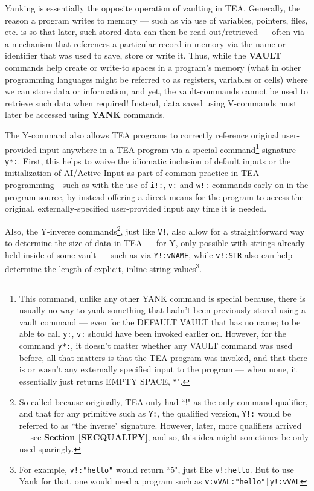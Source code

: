 \documentclass[a4paper, 18pt]{book} %
\begin{document}
{{{Yanking is essentially the opposite operation of vaulting in TEA. Generally, the reason a program writes to memory --- such as via use of variables, pointers, files, etc. is so that later, such stored data can then be read-out/retrieved --- often via a mechanism that references a particular record in memory via the name or identifier that was used to save, store or write it. Thus, while the \textbf{VAULT} commands help create or write-to spaces in a program's memory (what in other programming languages might be referred to as registers, variables or cells) where we can store data or information, and yet, the vault-commands cannot be used to retrieve such data when required! Instead, data saved using V-commands must later be accessed using \textbf{YANK} commands.

\vspace{2em}

The Y-command also allows TEA programs to correctly reference original user-provided input anywhere in a TEA program via a special command\footnote{This command, unlike any other YANK command is special because, there is usually no way to yank something that hadn't been previously stored using a vault command --- even for the DEFAULT VAULT that has no name; to be able to call \texttt{y:}, \texttt{v:} should have been invoked earlier on. However, for the command \texttt{y*:}, it doesn't matter whether any VAULT command was used before, all that matters is that the TEA program was invoked, and that there is or wasn't any externally specified input to the program --- when none, it essentially just returns EMPTY SPACE, ``".} signature \texttt{y*:}. First, this helps to waive the idiomatic inclusion of default inputs or the initialization of AI/Active Input as part of common practice in TEA programming---such as with the use of \texttt{i!:}, \texttt{v:} and \texttt{w!:} commands early-on in the program source, by instead offering a direct means for the program to access the original, externally-specified user-provided input any time it is needed. 


\vspace{2em}


Also, the Y-inverse commands\footnote{So-called because originally, TEA only had ``!" as the only command qualifier, and that for any primitive such as \texttt{Y:}, the qualified version, \texttt{Y!:} would be referred to as ``the inverse" signature. However, later, more qualifiers arrived --- see \textbf{\hyperref[SECQUALIFY]{Section \ref{SECQUALIFY}}}, and so, this idea might sometimes be only used sparingly.}, just like \texttt{V!}, also allow for a straightforward way to determine the size of data in TEA --- for Y, only possible with strings already held inside of some vault --- such as via \texttt{Y!:vNAME}, while \texttt{v!:STR} also can help determine the length of explicit, inline string values\footnote{For example, \texttt{v!:"hello"} would return ``5", just like \texttt{v!:hello}. But to use Yank for that, one would need a program such as \texttt{v:vVAL:"hello"|y!:vVAL}}.


}}}
\end{document}
